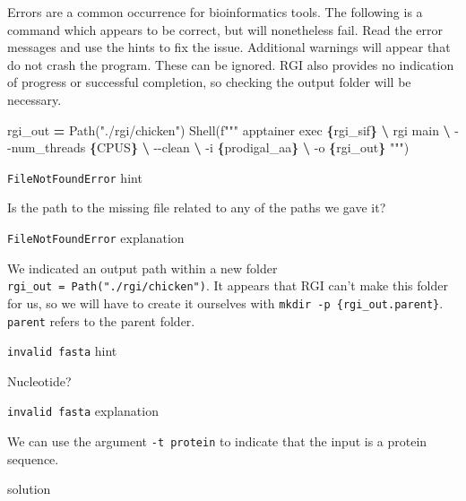 \documentclass[
]{book}
\newenvironment{Shaded}{\begin{snugshade}}{\end{snugshade}}
\newcommand{\NormalTok}[1]{#1}
\newcommand{\OperatorTok}[1]{\textcolor[rgb]{0.81,0.36,0.00}{\textbf{#1}}}
\newcommand{\SpecialCharTok}[1]{\textcolor[rgb]{0.81,0.36,0.00}{\textbf{#1}}}
\newcommand{\SpecialStringTok}[1]{\textcolor[rgb]{0.31,0.60,0.02}{#1}}
\newcommand{\StringTok}[1]{\textcolor[rgb]{0.31,0.60,0.02}{#1}}
\begin{document}
Errors are a common occurrence for bioinformatics tools. The following is a command which appears to be correct,
but will nonetheless fail. Read the error messages and use the hints to fix the issue. Additional warnings will appear
that do not crash the program. These can be ignored. RGI also provides no indication of progress or successful completion,
so checking the output folder will be necessary.

\begin{Shaded}
\begin{Highlighting}[numbers=left,,]
\NormalTok{rgi\_out }\OperatorTok{=}\NormalTok{ Path(}\StringTok{"./rgi/chicken"}\NormalTok{)}
\NormalTok{Shell(}\SpecialStringTok{f"""}
\SpecialStringTok{apptainer exec }\SpecialCharTok{\{}\NormalTok{rgi\_sif}\SpecialCharTok{\}}\SpecialStringTok{ }\OperatorTok{\textbackslash{}}
\SpecialStringTok{    rgi main }\OperatorTok{\textbackslash{}}
\SpecialStringTok{        {-}{-}num\_threads }\SpecialCharTok{\{}\NormalTok{CPUS}\SpecialCharTok{\}}\SpecialStringTok{ }\OperatorTok{\textbackslash{}}
\SpecialStringTok{        {-}{-}clean }\OperatorTok{\textbackslash{}}
\SpecialStringTok{        {-}i }\SpecialCharTok{\{}\NormalTok{prodigal\_aa}\SpecialCharTok{\}}\SpecialStringTok{ }\OperatorTok{\textbackslash{}}
\SpecialStringTok{        {-}o }\SpecialCharTok{\{}\NormalTok{rgi\_out}\SpecialCharTok{\}}
\SpecialStringTok{"""}\NormalTok{)}
\end{Highlighting}
\end{Shaded}

\texttt{FileNotFoundError} hint

Is the path to the missing file related to any of the paths we gave it?

\texttt{FileNotFoundError} explanation

We indicated an output path within a new folder \texttt{rgi\_out\ =\ Path("./rgi/chicken")}. It appears that RGI can't make this folder for us,
so we will have to create it ourselves with \texttt{mkdir\ -p\ \{rgi\_out.parent\}}. \texttt{parent} refers to the parent folder.

\texttt{invalid\ fasta} hint

Nucleotide?

\texttt{invalid\ fasta} explanation

We can use the argument \texttt{-t\ protein} to indicate that the input is a protein sequence.

solution
\end{document}
